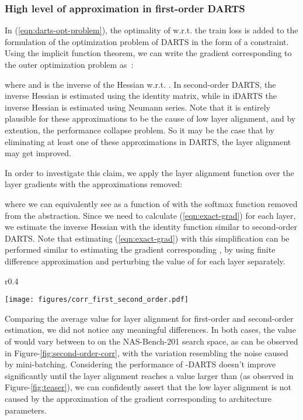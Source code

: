 \documentclass{article} \usepackage{fancyhdr, iclr2023_conference, times}
\newcommand{\mydarts}{-DARTS\xspace}
\newcommand{\lambdafn}{layer alignment\xspace}
\begin{document}
\subsubsection{High level of approximation in first-order DARTS}
\par In (\ref{eqn:darts-opt-problem}), the optimality of  w.r.t. the train loss is added to the formulation of the optimization problem of DARTS in the form of a constraint. Using the implicit function theorem, we can write the gradient corresponding to the outer optimization problem as~\citep{DBLP:conf/icml/ZhangSPCAH21}:

where  and  is the inverse of the Hessian w.r.t. . In second-order DARTS, the inverse Hessian is estimated using the identity matrix, while in iDARTS the inverse Hessian is estimated using Neumann series. Note that it is entirely plausible for these approximations to be the cause of low \lambdafn, and by extention, the performance collapse problem. So it may be the case that by eliminating at least one of these approximations in DARTS, the \lambdafn may get improved. 
\par In order to investigate this claim, we apply the \lambdafn function  over the layer gradients with the approximations removed:

where we can equivalently see  as a function of  with the softmax function removed from the abstraction. Since we need to calculate (\ref{eqn:exact-grad}) for each layer, we estimate the inverse Hessian with the identity function similar to second-order DARTS. Note that estimating (\ref{eqn:exact-grad}) with this simplification can be performed similar to estimating the gradient corresponding , by using finite difference approximation and perturbing the value of  for each layer separately.
\par \begin{wrapfigure}{r}{0.4\textwidth}
  \vspace{-23pt}
  \begin{center}
    \texttt{[image: figures/corr\_first\_second\_order.pdf]}
  \end{center}
  \vspace{-15pt}
  \caption{The average \lambdafn for the first and second-order estimation of gradients of the layers, compared to \mydarts.}
  \vspace{-10pt}
  \label{fig:second-order-corr}
\end{wrapfigure}Comparing the average value for \lambdafn for first-order and second-order estimation, we did not notice any meaningful differences. In both cases, the value of  would vary between  to  on the NAS-Bench-201 search space, as can be observed in Figure-\ref{fig:second-order-corr}, with the variation resembling the noise caused by mini-batching. Considering the performance of \mydarts doesn't improve significantly until the \lambdafn reaches a value larger than  (as observed in Figure-\ref{fig:teaser}), we can confidently assert that the low \lambdafn is not caused by the approximation of the gradient corresponding to architecture parameters.
\end{document}
